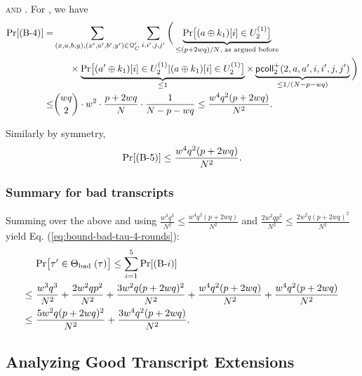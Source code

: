 %




\arrangespace

\noindent\textsc{\bfour and \bfive}. For \bfour, we have
%
\begin{align*}
\Pr[\text{(B-4)}] 
=   &  \sum_{(x,a,b,y),(x',a',b',y')\in\mathcal{Q}_{C}'}\sum_{i,i',j,j'}\bigg(\underbrace{{\Pr}\big[(a\oplus k_1)[i]\in U_2^{(1)}\big]}_{\leq(p+2wq)/N\text{, as argued before}}     \\
& \ \ \ \ \ \times
\underbrace{{\Pr}\big[(a'\oplus k_1)[i]\in U_2^{(1)}|(a\oplus k_1)[i]\in U_2^{(1)}\big]}_{\leq1}\times\underbrace{\mathsf{pcoll}_{2}^+(2,a,a',i,i',j,j')}_{\leq1/(N-p-wq)}   \bigg)      \\
\leq  &  {wq\choose 2}\cdot w^2\cdot\frac{p+2wq}{N}\cdot\frac{1}{N-p-wq}\leq
\frac{w^4q^2(p+2wq)}{N^2}.
\end{align*}
%

Similarly by symmetry,
%
\begin{align*}
\Pr[\text{(B-5)}] 
\leq
\frac{w^4q^2(p+2wq)}{N^2}.
\end{align*}




\subsubsection{Summary for bad transcripts}


Summing over the above and using $\frac{w^3q^3}{N^2}\leq\frac{w^4q^2(p+2wq)}{N^2}$ and $\frac{2w^{2} q p^2}{N^{2}}\leq\frac{2w^2q(p+2wq)^2}{N^2}$ yield Eq. (\ref{eq:bound-bad-tau-4-rounds}):
%
\begin{align*}
&  {\Pr}\big[ \tau' \in \Theta_{\text {bad }}(\tau)\big]  \leq \sum_{i=1}^{5}\Pr[\text{(B-}i)]       \\
\leq~  & \frac{w^3q^3}{N^2}+
\frac{2w^{2} q p^2}{N^{2}}+
\frac{3w^2q(p+2wq)^2}{N^2}+
\frac{w^4q^2(p+2wq)}{N^2}+
\frac{w^4q^2(p+2wq)}{N^2}             \\
\leq~  & \frac{5w^2q(p+2wq)^2}{N^2}+
\frac{3w^4q^2(p+2wq)}{N^2}.
\end{align*}
%






\subsection{Analyzing Good Transcript Extensions}
\label{sec:good-tau-4-rounds}

